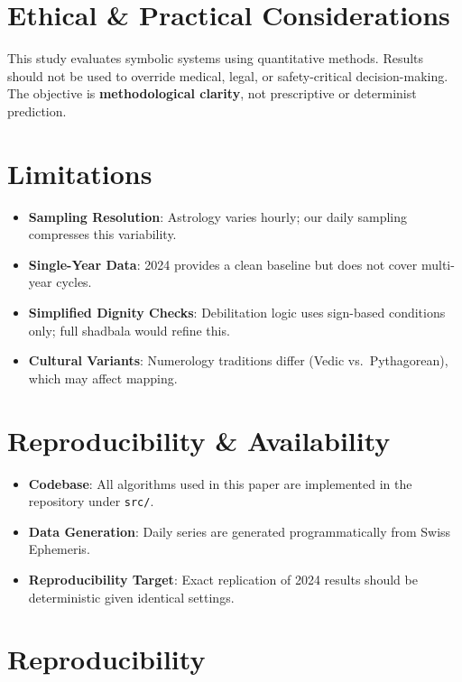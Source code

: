 \documentclass[
  11pt,
  a4paper,
  oneside,
  openany]{report}
\providecommand{\tightlist}{%
  \setlength{\itemsep}{0pt}\setlength{\parskip}{0pt}}\usepackage{longtable,booktabs,array}
\begin{document}
\chapter{Ethical \& Practical
Considerations}\label{ethical-practical-considerations}

This study evaluates symbolic systems using quantitative methods.
Results should not be used to override medical, legal, or
safety-critical decision-making. The objective is \textbf{methodological
clarity}, not prescriptive or determinist prediction.

\chapter{Limitations}\label{limitations}

\begin{itemize}
\tightlist
\item
  \textbf{Sampling Resolution}: Astrology varies hourly; our daily
  sampling compresses this variability.
\item
  \textbf{Single-Year Data}: 2024 provides a clean baseline but does not
  cover multi-year cycles.
\item
  \textbf{Simplified Dignity Checks}: Debilitation logic uses sign-based
  conditions only; full shadbala would refine this.
\item
  \textbf{Cultural Variants}: Numerology traditions differ (Vedic
  vs.~Pythagorean), which may affect mapping.
\end{itemize}

\chapter{Reproducibility \&
Availability}\label{reproducibility-availability}

\begin{itemize}
\tightlist
\item
  \textbf{Codebase}: All algorithms used in this paper are implemented
  in the repository under \texttt{src/}.
\item
  \textbf{Data Generation}: Daily series are generated programmatically
  from Swiss Ephemeris.
\item
  \textbf{Reproducibility Target}: Exact replication of 2024 results
  should be deterministic given identical settings.
\end{itemize}

\FloatBarrier

\chapter{Reproducibility}\label{reproducibility}
\end{document}
